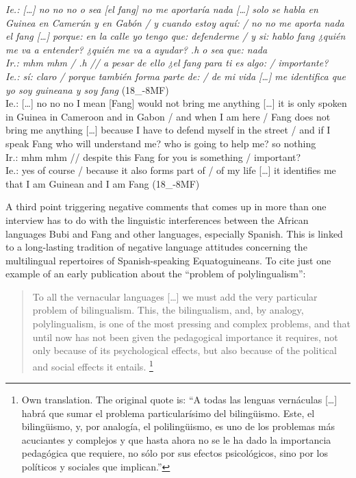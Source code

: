 \documentclass[output=paper]{langscibook}
\begin{document}
\begin{exe}
\ex\label{schlumpf:ex4}
	\textit{Ie.: […] no no no o sea [el fang] no me aportaría nada […] solo se habla en Guinea en Camerún y en Gabón / y cuando estoy aquí: / no no me aporta nada el fang […] porque: en la calle yo tengo que: defenderme / y si: hablo fang ¿quién me va a entender? ¿quién me va a ayudar? .h o sea que: nada\\
Ir.: mhm mhm / .h // a pesar de ello ¿el fang para ti es algo: / importante?\\
Ie.: sí: claro / porque también forma parte de: / de mi vida […] me identifica que yo soy guineana y soy fang} (18\_-8MF)\\
Ie.: […] no no no I mean [Fang] would not bring me anything […] it is only spoken in Guinea in Cameroon and in Gabon / and when I am here / Fang does not bring me anything […] because I have to defend myself in the street / and if I speak Fang who will understand me? who is going to help me? so nothing\\
Ir.: mhm mhm // despite this Fang for you is something / important?\\
Ie.: yes of course / because it also forms part of / of my life […] it identifies me that I am Guinean and I am Fang (18\_-8MF)
\end{exe}

A third point triggering negative comments that comes up in more than one interview has to do with the linguistic interferences between the African languages Bubi and Fang and other languages, especially Spanish. This is linked to a long-lasting tradition of negative language attitudes concerning the multilingual repertoires of Spanish-speaking Equatoguineans. To cite just one example of an early publication about the ``problem of polylingualism'':

\begin{quote}
To all the vernacular languages […] we must add the very particular problem of bilingualism. This, the bilingualism, and, by analogy, polylingualism, is one of the most pressing and complex problems, and that until now has not been given the pedagogical importance it requires, not only because of its psychological effects, but also because of the political and social effects it entails. \citep[52]{castillo_barril_influencia_1969}\footnote{Own translation. The original quote is: “A todas las lenguas vernáculas […] habrá que sumar el problema particularísimo del bilingüismo. Este, el bilingüismo, y, por analogía, el polilingüismo, es uno de los problemas más acuciantes y complejos y que hasta ahora no se le ha dado la importancia pedagógica que requiere, no sólo por sus efectos psicológicos, sino por los políticos y sociales que implican.”}
\end{quote}
\end{document}
